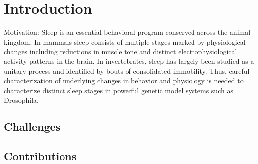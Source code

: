\chapter{Introduction}

Motivation: Sleep is an essential behavioral program conserved across the animal kingdom.
In mammals sleep consists of multiple stages marked by physiological changes including reductions in muscle tone and distinct electrophysiological activity patterns in the brain.
In invertebrates, sleep has largely been studied as a unitary process and identified by bouts of consolidated immobility.
Thus, careful characterization of underlying changes in behavior and physiology is needed to characterize distinct sleep stages in powerful genetic model systems such as Drosophila.

\section{Challenges}\label{section:challanges}

\section{Contributions}
